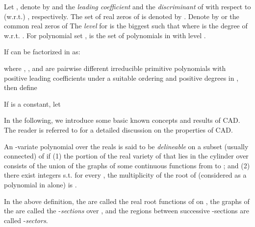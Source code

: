 \documentclass[amsthm]{elsart}
\begin{document}
\begin{defn}
Let , denote by  and  the {\em leading coefficient} and the {\em discriminant} of  with respect to (w.r.t.) , respectively. The set of real zeros of  is denoted by . Denote by  or  the common real zeros of 
The {\em level} for  is the biggest  such that  where  is the degree of  w.r.t. .
        For polynomial set ,  is the set of polynomials in  with level .
\end{defn} \begin{comment}
\begin{defn}
        Let  be the symmetric permutation group of . Define  to be the subgroup of , where any element  of  fixes , {\it i.e.},  for .
\end{defn}
\end{comment}

\begin{defn}\label{de:sqrfree}
If  can be factorized in  as:
        
        where , ,  and  are
pairwise different irreducible primitive polynomials with positive leading coefficients under a suitable ordering and positive degrees in ,
then define
        
        If  is a constant, let  
\end{defn}


In the following, we introduce some basic known concepts and results of CAD. The reader is referred to \cite{collins1,Hong:90a,Collins_Hong:91,McCallum1,McCallum2,Brown01a} for a detailed discussion on the properties of CAD.

\begin{defn}\citep{collins1,McCallum1}\label{def:delineable}
        An -variate polynomial  over the reals is said to be {\em delineable} on a subset  (usually connected) of  if
        (1) the portion of the real variety of  that lies in the cylinder  over  consists of the union of the graphs of some  continuous functions  from  to ; and
        (2) there exist integers  s.t. for every , the multiplicity of the root  of  (considered as a polynomial in  alone) is .
\end{defn}


\begin{defn}\citep{collins1,McCallum1}
        In the above definition, the  are called the real root functions of  on , the graphs of the  are called the -{\em sections} over , and the regions between successive -sections are called -{\em sectors}.

\end{defn}
\end{document}

